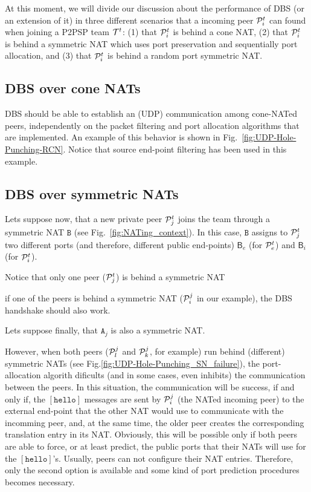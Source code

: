 At this moment, we will divide our discussion about the performance of
DBS (or an extension of it) in three different scenarios that a
incoming peer ${\cal P}^t_i$ can found when joining a P2PSP team
${\cal T}^t$: (1) that ${\cal P}^t_i$ is behind a cone NAT, (2) that
${\cal P}^t_i$ is behind a symmetric NAT which uses port preservation
and sequentially port allocation, and (3) that ${\cal P}^t_i$ is
behind a random port symmetric NAT.

\subsection{DBS over cone NATs}
DBS should be able to establish an (UDP) communication among
cone-NATed peers, independently on the packet filtering and port
allocation algorithms that are implemented. An example of this
behavior is shown in Fig.~\ref{fig:UDP-Hole-Punching-RCN}. Notice that
source end-point filtering has been used in this example.

\subsection{DBS over symmetric NATs}


Lets suppose now, that a new private peer ${\cal P}^t_j$ joins the
team through a symmetric NAT $\mathtt{B}$ (see
Fig.~\ref{fig:NATing_context}). In this case, $\mathtt{B}$ assigns
to ${\cal P}^t_j$ two different ports (and therefore, different
public end-points) $\mathsf{B}_e$ (for ${\cal P}^t_e$) and
$\mathsf{B}_i$ (for ${\cal P}^t_i$).

Notice that only one peer (${\cal P}^t_j$) is behind a symmetric NAT

if one of the peers is
behind a symmetric NAT (${\cal P}^j_i$ in our example), the DBS
handshake should also work.

Lets suppose finally, that $\mathtt{A}_j$ is also a symmetric NAT.

 However, when both peers (${\cal P}^j_l$ and
${\cal P}^j_k$, for example) run behind (different) symmetric NATs
(see Fig.\ref{fig:UDP-Hole-Punching_SN_failure}), the port-allocation
algorith dificults (and in some cases, even inhibits) the
communication between the peers. In this situation, the communication
will be success, if and only if, the $[\mathtt{hello}]$ messages are
sent by ${\cal P}^j_i$ (the NATed incoming peer) to the external
end-point that the other NAT would use to communicate with the
incomming peer, and, at the same time, the older peer creates the
corresponding translation entry in its NAT. Obviously, this will be
possible only if both peers are able to force, or at least predict,
the public ports that their NATs will use for the
$[\mathtt{hello}]$'s. Usually, peers can not configure their NAT
entries. Therefore, only the second option is available and some kind
of port prediction procedures becomes necessary.

